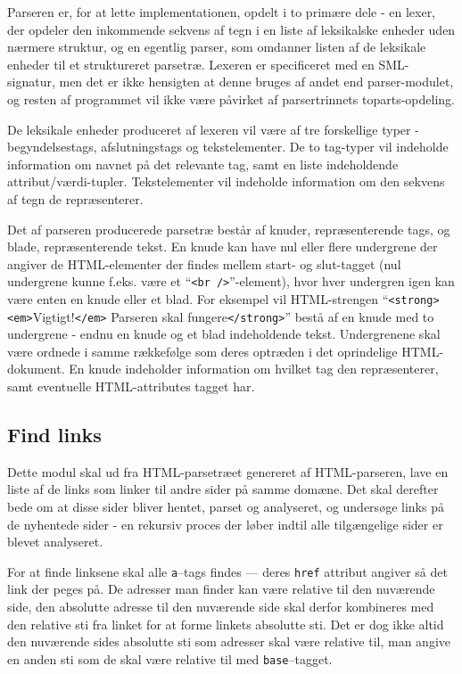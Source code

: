 \documentclass[a4paper,oneside,article, titlepage]{article}
\begin{document}
Parseren er, for at lette implementationen, opdelt i to primære dele -
en lexer, der opdeler den inkommende sekvens af tegn i en liste af
leksikalske enheder uden nærmere struktur, og en egentlig parser, som
omdanner listen af de leksikale enheder til et struktureret
parsetræ. Lexeren er specificeret med en SML-signatur, men det er ikke
hensigten at denne bruges af andet end parser-modulet, og resten af
programmet vil ikke være påvirket af parsertrinnets toparts-opdeling.

De leksikale enheder produceret af lexeren vil være af tre forskellige
typer - begyndelsestags, afslutningstags og tekstelementer. De to
tag-typer vil indeholde information om navnet på det relevante tag,
samt en liste indeholdende attribut/værdi-tupler. Tekstelementer vil
indeholde information om den sekvens af tegn de repræsenterer.

Det af parseren producerede parsetræ består af knuder, repræsenterende
tags, og blade, repræsenterende tekst. En knude kan have nul eller
flere undergrene der angiver de HTML-elementer der findes mellem
start- og slut-tagget (nul undergrene kunne f.eks. være et
``\texttt{<br />}''-element), hvor hver undergren igen kan være enten
en knude eller et blad. For eksempel vil HTML-strengen
``\texttt{<strong>}\texttt{<em>}Vigtigt!\texttt{</em>} Parseren skal
fungere\texttt{</strong>}'' bestå af en knude med to undergrene -
endnu en knude og et blad indeholdende tekst. Undergrenene skal være
ordnede i samme rækkefølge som deres optræden i det oprindelige
HTML-dokument. En knude indeholder information om hvilket tag den
repræsenterer, samt eventuelle HTML-attributes tagget har.

\subsection{Find links}
Dette modul skal ud fra HTML-parsetræet genereret af HTML-parseren,
lave en liste af de links som linker til andre sider på samme domæne.
Det skal derefter bede om at disse sider bliver hentet, parset og
analyseret, og undersøge links på de nyhentede sider - en rekursiv
proces der løber indtil alle tilgængelige sider er blevet analyseret.

For at finde linksene skal alle \texttt{a}--tags findes --- deres
\texttt{href} attribut angiver så det link der peges på. De adresser
man finder kan være relative til den nuværende side, den absolutte
adresse til den nuværende side skal derfor kombineres med den relative
sti fra linket for at forme linkets absolutte sti. Det er dog ikke
altid den nuværende sides absolutte sti som adresser skal være
relative til, man angive en anden sti som de skal være relative til
med \texttt{base}--tagget. 
\end{document}
